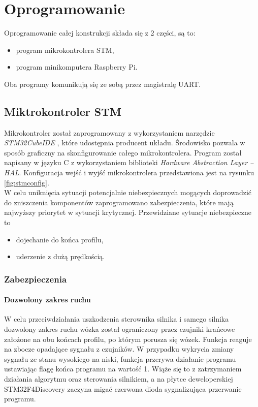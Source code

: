 \chapter{Oprogramowanie}

Oprogramowanie całej konstrukcji składa się z 2 części, są to:
\begin{itemize}
    \item program mikrokontrolera STM,
    \item program minikomputera Raspberry Pi.
\end{itemize}
Oba programy komunikują się ze sobą przez magistralę UART.

\section{Miktrokontroler STM}
Mikrokontroler został zaprogramowany z wykorzystaniem narzędzie \textit{STM32CubeIDE} \cite{cudeide}, które udostępnia producent układu. Środowisko pozwala w sposób graficzny na skonfigurowanie całego mikrokontrolera. Program został napisany w języku C z wykorzystaniem biblioteki \textit{Hardware Abstraction Layer -- HAL}. Konfiguracja wejść i wyjść mikrokontrolera przedstawiona jest na rysunku \ref{fig:stmconfig}.\\
W celu uniknięcia sytuacji potencjalnie niebezpiecznych mogących doprowadzić do zniszczenia komponentów zaprogramowano zabezpieczenia, które mają najwyższy priorytet w sytuacji krytycznej. Przewidziane sytuacje niebezpieczne to
\begin{itemize}
    \item dojechanie do końca profilu,
    \item uderzenie z dużą prędkością.
\end{itemize}

\subsection{Zabezpieczenia}
\subsubsection{Dozwolony zakres ruchu}
W celu przeciwdziałania uszkodzenia sterownika silnika i samego silnika dozwolony zakres ruchu wózka został ograniczony przez czujniki krańcowe założone na obu końcach profilu, po którym porusza się wózek. Funkcja reaguje na zbocze opadające sygnału z czujników. W przypadku wykrycia zmiany sygnału ze stanu wysokiego na niski, funkcja przerywa działanie programu ustawiając flagę końca programu na wartość 1. Wiąże się to z zatrzymaniem działania algorytmu oraz sterowania silnikiem, a na płytce deweloperskiej STM32F4Discovery zaczyna migać czerwona dioda sygnalizująca przerwanie programu. 

